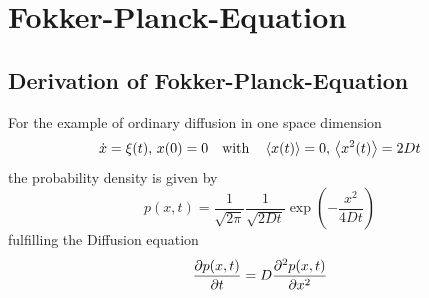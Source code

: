 \documentclass{notebook}
\begin{document}
\section{Fokker-Planck-Equation}

\subsection*{Derivation of Fokker-Planck-Equation}

\begin{remark}
	
	For the example of ordinary diffusion in one space dimension
	\begin{equation}
	\dot{x} = \xi(t), \, x(0) = 0 \quad \mathrm{with} \quad \expval{x(t)} = 0, \, \expval{x^2(t)} = 2 D t
	\end{equation}
	the probability density is given by
	\begin{equation}
	p(x,t) = \frac{1}{\sqrt{2 \pi}} \frac{1}{\sqrt{2 D t}} \exp(-\frac{x^2}{4 D t})
	\end{equation}
	fulfilling the Diffusion equation
	\begin{equation}
	\pdv{p(x,t)}{t} = D \pdv[2]{p(x,t)}{x}
	\end{equation}
\end{remark}
\end{document}
